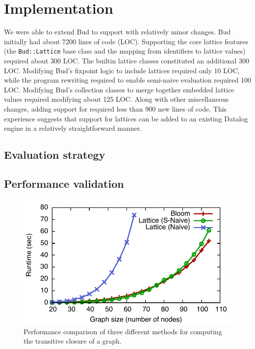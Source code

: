 \section{Implementation}
\label{sec:impl}

We were able to extend Bud to support \lang with relatively minor changes. Bud
initially had about 7200 lines of code (LOC). Supporting the core lattice
features (the \texttt{Bud::Lattice} base class and the mapping from identifiers
to lattice values) required about 300 LOC. The builtin lattice classes
constituted an additional 300 LOC. Modifying Bud's fixpoint logic to include
lattices required only 10 LOC, while the program rewriting required to enable
semi-naive evaluation required 100 LOC. Modifying Bud's collection classes to
merge together embedded lattice values required modifying about 125 LOC. Along
with other miscellaneous changes, adding support for \lang required less than
900 new lines of code. This experience suggests that support for lattices can be
added to an existing Datalog engine in a relatively straightforward manner.

\subsection{Evaluation strategy}
\label{sec:lattice-eval-strat}

\subsection{Performance validation}
\label{sec:lattice-perf}

\begin{figure}[t]
\includegraphics[width=\linewidth]{fig/sn_perf}
\caption{Performance comparison of three different methods for computing the
  transitive closure of a graph.}
\label{fig:tc-perf-graph}
\end{figure}

